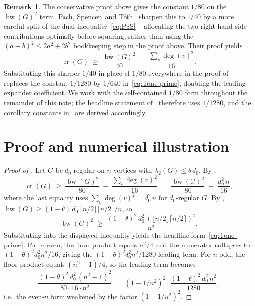 \documentclass[11pt,a4paper]{article}
\theoremstyle{definition}
\newtheorem{remark}[theorem]{Remark}
\DeclareMathOperator{\crN}{cr}
\DeclareMathOperator{\bw}{bw}
\begin{document}
\begin{remark}\label{rem:PST-constants}
The conservative proof above gives the constant $1/80$ on the
$\bw(G)^{2}$ term. Pach, Spencer, and T\'oth~\cite[Section 4]{PachSpencerToth}
sharpen this to $1/40$ by a more careful split of the dual
inequality~\eqref{eq:PSS} -- allocating the two right-hand-side
contributions optimally before squaring, rather than using the
$(a + b)^{2} \le 2a^{2} + 2b^{2}$ bookkeeping step in the proof
above. Their proof yields
\[
   \crN(G) \;\ge\; \frac{\bw(G)^{2}}{40}
                 \;-\; \frac{\sum_v \deg(v)^{2}}{16}.
\]
Substituting this sharper $1/40$ in place of $1/80$ everywhere in
the proof of  replaces the constant $1/1280$ by
$1/640$ in~\eqref{eq:Tone-prime}, doubling the leading expander
coefficient. We work with the self-contained $1/80$ form
throughout the remainder of this note; the headline statement
of~ therefore uses $1/1280$, and the corollary
constants in~ are derived accordingly.
\end{remark}

\section{Proof and numerical illustration}\label{sec:proof}

\begin{proof}[Proof of ]
Let $G$ be $d_0$-regular on $n$ vertices with
$\lambda_2(G) \le \theta\,d_0$. By ,
\[
   \crN(G) \;\ge\; \frac{\bw(G)^{2}}{80} \;-\; \frac{\sum_v \deg(v)^{2}}{16}
              \;=\; \frac{\bw(G)^{2}}{80} \;-\; \frac{d_0^{2}\,n}{16},
\]
where the last equality uses $\sum_v \deg(v)^{2} = d_0^{2}\,n$ for
$d_0$-regular $G$. By ,
$\bw(G) \ge (1 - \theta) \, d_0 \, \lfloor n/2 \rfloor \lceil n/2 \rceil / n$,
so
\[
   \bw(G)^{2} \;\ge\;
     \frac{(1 - \theta)^{2}\,d_0^{2}\,(\lfloor n/2 \rfloor \lceil n/2 \rceil)^{2}}{n^{2}}.
\]
Substituting into the displayed inequality yields the headline
form~\eqref{eq:Tone-prime}. For $n$ even, the floor product equals
$n^{2}/4$ and the numerator collapses to
$(1 - \theta)^{2} d_0^{2} n^{2}/16$, giving the
$(1 - \theta)^{2} d_0^{2} n^{2}/1280$ leading term. For
$n$ odd, the floor product equals $(n^{2} - 1)/4$, so the
leading term becomes
\[
   \frac{(1 - \theta)^{2}\,d_0^{2}\,(n^{2} - 1)^{2}}{80 \cdot 16 \cdot n^{2}}
   \;=\; (1 - 1/n^{2})^{2} \cdot \frac{(1 - \theta)^{2}\,d_0^{2}\,n^{2}}{1280},
\]
i.e.\ the even-$n$ form weakened by the factor
$(1 - 1/n^{2})^{2}$.
\end{proof}
\end{document}
